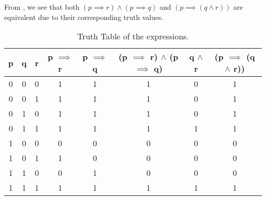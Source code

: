 %
%

\begin{subquestions}


\subquestion

\begin{subsubquestions}
	
\subsubquestion

From , we see that both $(p \implies r) \land (p \implies q)$ and $(p \implies (q \land r))$ are equivalent due to their corresponding truth values.

\begin{table}[ht]
	\centering
	\begin{tabular}{|c|c|c|c|c|c|c|c|}
		\hline
		p & q & r & p $\implies$ r & p $\implies$ q & (p $\implies$ r) $\land$ (p $\implies$ q) & q $\land$ r & (p $\implies$ (q $\land$ r)) \\
		\hline
		0 & 0 & 0 & 1 & 1 & 1 & 0 & 1 \\
		0 & 0 & 1 & 1 & 1 & 1 & 0 & 1 \\
		0 & 1 & 0 & 1 & 1 & 1 & 0 & 1 \\
		0 & 1 & 1 & 1 & 1 & 1 & 1 & 1 \\
		1 & 0 & 0 & 0 & 0 & 0 & 0 & 0 \\
		1 & 0 & 1 & 1 & 0 & 0 & 0 & 0  \\
		1 & 1 & 0 & 0 & 1 & 0 & 0 & 0 \\
		1 & 1 & 1 & 1 & 1 & 1 & 1 & 1 \\
		\hline
	\end{tabular}
\caption{\label{2012:q2:TruthTab1} Truth Table of the expressions.}
\end{table}


\subsubquestion


\end{subsubquestions}
\end{subquestions}
